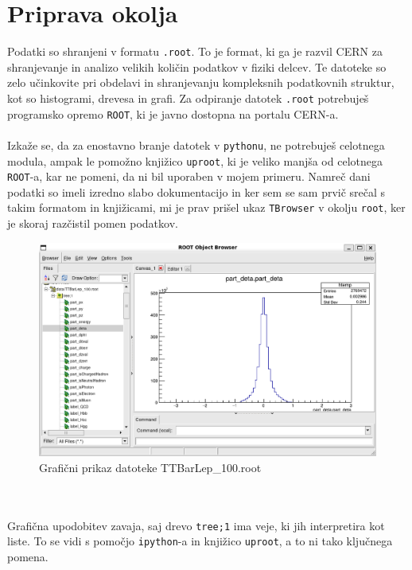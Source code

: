 \section{Priprava okolja}\label{sec:1}
Podatki so shranjeni v formatu \verb|.root|. To je format, ki ga je razvil CERN
za shranjevanje in analizo velikih količin podatkov v fiziki delcev. Te datoteke
so zelo učinkovite pri obdelavi in shranjevanju kompleksnih podatkovnih struktur,
kot so histogrami, drevesa in grafi.
Za odpiranje datotek \verb|.root| potrebuješ programsko opremo \verb|ROOT|, ki je
javno dostopna na portalu CERN-a.
\\
\\
Izkaže se, da za enostavno branje datotek v \verb|pythonu|, ne potrebuješ celotnega modula, ampak
le pomožno knjižico \verb|uproot|, ki je veliko manjša od celotnega \verb|ROOT|-a, kar ne
pomeni, da ni bil uporaben v mojem primeru. Namreč dani podatki so imeli izredno slabo
dokumentacijo in ker sem se sam prvič srečal s takim formatom in knjižicami, mi je prav prišel ukaz
\verb|TBrowser|
v okolju \verb|root|, ker je skoraj razčistil pomen podatkov.
\\
\begin{figure}[h]
    \begin{center}
        \includegraphics[width=13cm]{sections/section1/figures/TBrowser.png}
        \caption{Grafični prikaz datoteke TTBarLep\_100.root}
        \label{slika 1}
    \end{center}
\end{figure}
\\
\\
Grafična upodobitev zavaja, saj drevo \verb|tree;1| ima veje, ki
jih interpretira kot liste. To se vidi s pomočjo \verb|ipython|-a in
knjižico \verb|uproot|, a to ni tako ključnega pomena.
